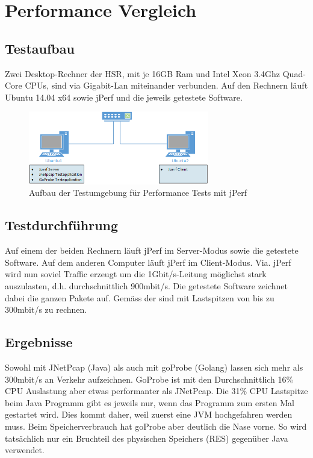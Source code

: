 \section{Performance Vergleich}
\label{sec:Performance Vergleich}

\subsection{Testaufbau}
Zwei Desktop-Rechner der HSR, mit je 16GB Ram und Intel Xeon 3.4Ghz Quad-Core CPUs, sind via Gigabit-Lan miteinander verbunden. Auf den Rechnern läuft Ubuntu 14.04 x64 sowie jPerf und die jeweils getestete Software.

\begin{figure}[H]
    \begin{center}
		\includegraphics[width=0.7\textwidth]{start/img/PerformanceEvaluation.png}
    \end{center}
    \caption{Aufbau der Testumgebung für Performance Tests mit jPerf}
\end{figure}

\subsection{Testdurchführung}
Auf einem der beiden Rechnern läuft jPerf im Server-Modus sowie die getestete Software. Auf dem anderen Computer läuft jPerf im Client-Modus.
Via. jPerf wird nun soviel Traffic erzeugt um die 1Gbit/s-Leitung möglichst stark auszulasten, d.h. durchschnittlich 900mbit/s. Die getestete Software zeichnet dabei die ganzen Pakete auf. Gemäss der \osag{} sind mit Lastspitzen von bis zu 300mbit/s zu rechnen.

\subsection{Ergebnisse}
Sowohl mit JNetPcap (Java) als auch mit goProbe (Golang) lassen sich mehr als 300mbit/s an Verkehr aufzeichnen. GoProbe ist mit den Durchschnittlich 16\% CPU Auslastung aber etwas performanter als JNetPcap. Die 31\% CPU Lastspitze beim Java Programm gibt es jeweils nur, wenn das Programm zum ersten Mal gestartet wird. Dies kommt daher, weil zuerst eine \acs{JVM} hochgefahren werden muss.
Beim Speicherverbrauch hat goProbe aber deutlich die Nase vorne. So wird tatsächlich nur ein Bruchteil des physischen Speichers (RES\footnotemark[2]) gegenüber Java verwendet.

